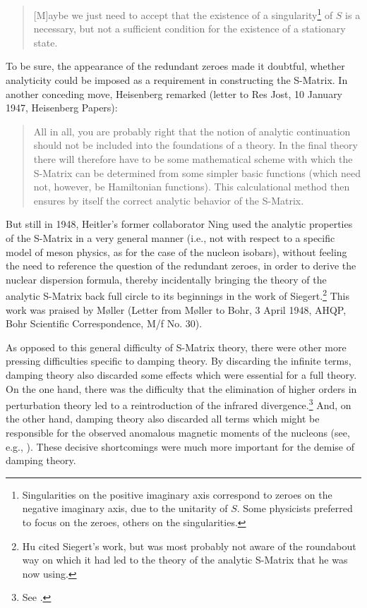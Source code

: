 \documentclass[12pt]{article}
\begin{document}
\begin{quote}
[M]aybe we just need to accept that the existence of a singularity\footnote{Singularities on the positive imaginary axis correspond to zeroes on the negative imaginary axis, due to the unitarity of $S$. Some physicists preferred to focus on the zeroes, others on the singularities.} of $S$ is a necessary, but not a sufficient condition for the existence of a stationary state.
\end{quote}

To be sure, the appearance of the redundant zeroes made it doubtful, whether analyticity could be imposed as a requirement in constructing the S-Matrix. In another conceding move, Heisenberg remarked (letter to Res Jost, 10 January 1947, Heisenberg Papers):

\begin{quote}
All in all, you are probably right that the notion of analytic continuation should not be included into the foundations of a theory. In the final theory there will therefore have to be some mathematical scheme with which the S-Matrix can be determined from some simpler basic functions (which need not, however, be Hamiltonian functions). This calculational method then ensures by itself the correct analytic behavior of the S-Matrix.
\end{quote}

But still in 1948, Heitler's former collaborator Ning \citet{hu_1948_on-the-application} used the analytic properties of the S-Matrix in a very general manner (i.e., not with respect to a specific model of meson physics, as for the case of the nucleon isobars), without feeling the need to reference the question of the redundant zeroes, in order to derive the nuclear dispersion formula, thereby incidentally bringing the theory of the analytic S-Matrix back full circle to its beginnings in the work of Siegert.\footnote{Hu cited Siegert's work, but was most probably not aware of the roundabout way on which it had led to the theory of the analytic S-Matrix that he was now using.} This work was praised by M\o ller (Letter from M\o ller to Bohr, 3 April 1948, AHQP, Bohr Scientific Correspondence, M/f No. 30).

As opposed to this general difficulty of S-Matrix theory, there were other more pressing difficulties specific to damping theory. By discarding the infinite terms, damping theory also discarded some effects which were essential for a full theory. On the one hand, there was the difficulty that the elimination of higher orders in perturbation theory led to a reintroduction of the infrared divergence.\footnote{See \citep{blum_2015_qed}.} And, on the other hand, damping theory also discarded all terms which might be responsible for the observed anomalous magnetic moments of the nucleons (see, e.g., \citep[p. 194]{heitler_1947_the-quantum}). These decisive shortcomings were much more important for the demise of damping theory.
\end{document}
